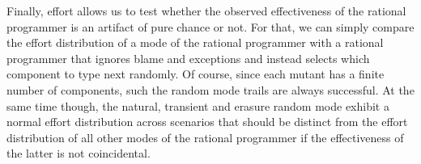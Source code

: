 Finally, effort allows us to test whether the observed effectiveness 
of the rational programmer is an artifact of pure chance or not.
For that, we can simply compare the effort distribution of a mode of the
rational programmer with a rational programmer that ignores blame and
exceptions and instead selects which component to type next randomly. 
Of course, since each mutant has a finite number of components, 
such the random mode trails are always successful. At the same time though,
the natural, transient and erasure random mode exhibit a normal effort
distribution across scenarios that should be distinct from the effort distribution of all other modes of
the rational programmer if the effectiveness of the latter is not
coincidental.




